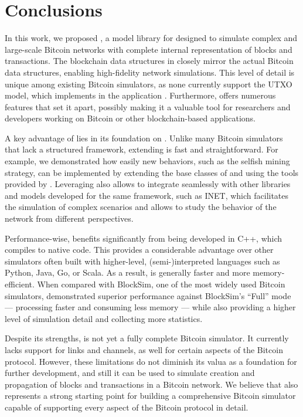 \chapter{Conclusions}\label{ch:conclusions}

In this work, we proposed \iblock{}, a model library for \omnetpp{} designed to
simulate complex and large-scale Bitcoin networks with complete internal
representation of blocks and transactions. The blockchain data structures in
\iblock{} closely mirror the actual Bitcoin data structures, enabling
high-fidelity network simulations. This level of detail is unique among
existing Bitcoin simulators, as none currently support the UTXO model, which
\iblock{} implements in the  application \cite{simureview}.
Furthermore, \iblock{} offers numerous features that set it apart, possibly
making it a valuable tool for researchers and developers working on Bitcoin or
other blockchain-based applications.

A key advantage of \iblock{} lies in its foundation on \omnetpp{}. Unlike many
Bitcoin simulators that lack a structured framework, extending \iblock{} is
fast and straightforward. For example, we demonstrated how easily new
behaviors, such as the selfish mining strategy, can be implemented by extending
the base classes of \iblock{} and using the tools provided by \omnetpp{}.
Leveraging \omnetpp{} also allows \iblock{} to integrate seamlessly with other
libraries and models developed for the same framework, such as INET, which
facilitates the simulation of complex scenarios and allows to study the
behavior of the network from different perspectives.

Performance-wise, \iblock{} benefits significantly from being developed in C++,
which compiles to native code. This provides a considerable advantage over
other simulators often built with higher-level, (semi-)interpreted languages
such as Python, Java, Go, or Scala. As a result, \iblock{} is generally faster
and more memory-efficient. When compared with BlockSim, one of the most widely
used Bitcoin simulators, \iblock{} demonstrated superior performance against
BlockSim's ``Full'' mode --- processing faster and consuming less memory ---
while also providing a higher level of simulation detail and collecting more
statistics.

Despite its strengths, \iblock{} is not yet a fully complete Bitcoin simulator.
It currently lacks support for \omnetpp{} links and channels, as well for
certain aspects of the Bitcoin protocol. However, these limitations do not
diminish its valua as a foundation for further development, and still it can be
used to simulate creation and propagation of blocks and transactions in a
Bitcoin network. We believe that \iblock{} also represents a strong starting
point for building a comprehensive Bitcoin simulator capable of supporting
every aspect of the Bitcoin protocol in detail.
